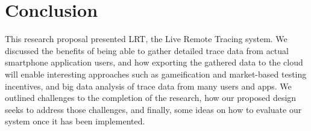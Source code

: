 \section{Conclusion}
This research proposal presented LRT, the Live Remote Tracing system. We discussed
the benefits of being able to gather detailed trace data from actual smartphone application
users, and how exporting the gathered data to the cloud will enable interesting approaches
such as gameification and market-based testing incentives, and big data analysis of
trace data from many users and apps. We outlined challenges to the completion of the research,
how our proposed design seeks to address those challenges, and finally, some ideas on how to
evaluate our system once it has been implemented.
